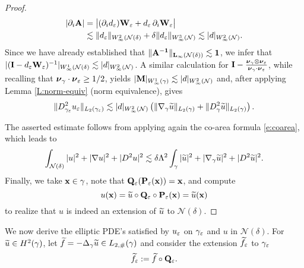 \begin{proof}
 \[ 
 \begin{aligned}
 |\partial_i {\bf A}|& = \big|(\partial_i d_\varepsilon) {\bf W}_\varepsilon + d_\varepsilon \,
 \partial_i {\bf W}_\varepsilon\big| 
 \\ & \lesssim \|d_\varepsilon\|_{W_\infty^2(\mathcal{N}(\delta)} + \delta \|d_\varepsilon\|_{W_\infty^3(\mathcal{N})} \lesssim |d|_{W_\infty^2(\mathcal{N})}.
 \end{aligned}
 \]
 Since we have already established that $\|\bf A^{-1}\|_{L_\infty({\mathcal{N}(\delta)})}\lesssim 1$, we infer that $|({\bf I}-d_\varepsilon {\bf W}_\varepsilon)^{-1}|_{W_\infty^1({\mathcal{N}(\delta)}} \lesssim |d|_{W_\infty^2(\mathcal{N})}$.   A similar calculation for ${\bf I} - \frac{{\boldsymbol \nu}_\gamma\otimes {\boldsymbol \nu}_\varepsilon}{{\boldsymbol \nu}_\gamma \cdot {\boldsymbol \nu}_\varepsilon}$, while recalling that ${\boldsymbol \nu}_\gamma \cdot {\boldsymbol \nu}_\varepsilon \ge 1/2$, yields  $|{\bf M}|_{W_\infty^1(\gamma)} \lesssim |d|_{W_\infty^2(\mathcal{N})}$ and, after applying Lemma \ref{L:norm-equiv} (norm equivalence), gives
%
\[ \|D_{\gamma_\varepsilon}^2 u_\varepsilon\|_{L_2(\gamma_\varepsilon)} \lesssim |d|_{W_\infty^2(\mathcal{N})} \left(\|\nabla_\gamma \widetilde{u}\|_{L_2(\gamma)} + \|D_\gamma^2 \widetilde{u}\|_{L_2(\gamma)}\right). \]


The asserted estimate follows from applying again the 
co-area formula \eqref{e:coarea}, which leads to
%
\[
\int_{\mathcal N(\delta)} |u|^2+|\nabla u|^2+|D^2u|^2\lesssim \delta \Lambda^2
\int_\gamma |\widetilde{u}|^2 + |\nabla_\gamma \widetilde{u}|^2 + |D^2\widetilde{u}|^2.
\]
%
Finally, we take ${\bf x}\in\gamma$, note that ${\mathbf{Q}_{\varepsilon}}({{\bf P}_\varepsilon}({\bf x}))={\bf x}$, and compute
%
\[
u({\bf x}) =  \widetilde{u}\circ{\mathbf{Q}_{\ensuremath{\varepsilon}}}\circ{{\bf P}_\varepsilon}({\bf x}) = \widetilde{u}({\bf x})
\]  
%
to realize that $u$ is indeed an extension of $\widetilde{u}$ to ${\mathcal N(\delta)}$.
\end{proof}
  
We now derive the elliptic PDE's satisfied by $u_\varepsilon$ on ${\gamma_\varepsilon}$ and $u$ in ${\mathcal N(\delta)}$.
For $\widetilde{u}\in H^2(\gamma)$, let
$\widetilde{f} = -\Delta_\gamma \widetilde{u} \in L_{2,\#}(\gamma)$ and consider the extension $\widetilde{f}_{\varepsilon}$ to
${\gamma_\varepsilon}$
%
\[
\widetilde{f}_{\varepsilon} := \widetilde{f} \circ {\mathbf{Q}_{\ensuremath{\varepsilon}}}.
\]
%

